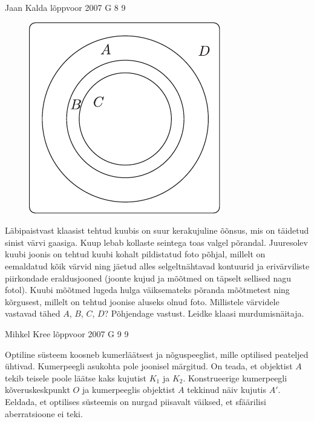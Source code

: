 \documentclass[11pt]{article}
\begin{document}
{%
{Jaan Kalda} %
{lõppvoor} %
{2007} %
{G 8} %
{9} %
{
\ifStatement
\begin{figure}
	\begin{center}
		\vspace{-20pt}
		\includegraphics[width=0.95\linewidth]{2007-v3g-08-yl}
	\end{center}
\end{figure}
Läbipaistvast klaasist tehtud kuubis on suur kerakujuline õõnsus, mis on täidetud sinist värvi gaasiga. Kuup lebab kollaste seintega toas valgel põrandal. Juuresolev kuubi joonis on tehtud kuubi kohalt pildistatud foto põhjal, millelt on eemaldatud kõik värvid ning jäetud alles selgeltnähtavad kontuurid ja erivärviliste piirkondade eraldusjooned (joonte kujud ja mõõtmed on täpselt sellised nagu fotol). Kuubi mõõtmed lugeda hulga väiksemateks põranda mõõtmetest ning kõrgusest, millelt on tehtud joonise aluseks olnud foto. Millistele värvidele vastavad tähed $A$, $B$, $C$, $D$? Põhjendage vastust. Leidke klaasi murdumisnäitaja.
\fi
}

{Mihkel Kree} %
{lõppvoor} %
{2007} %
{G 9} %
{9} %
{
\ifStatement
Optiline süsteem koosneb kumerläätsest ja nõguspeeglist, mille optilised peateljed ühtivad. Kumerpeegli asukohta pole joonisel märgitud. On teada, et objektist $A$ tekib teisele poole läätse kaks kujutist $K_1$ ja $K_2$. Konstrueerige kumerpeegli kõveruskeskpunkt $O$ ja kumerpeeglis objektist $A$ tekkinud näiv kujutis $A'$. Eeldada, et optilises süsteemis on nurgad piisavalt väiksed, et sfäärilisi aberratsioone ei teki.

}}
\end{document}
